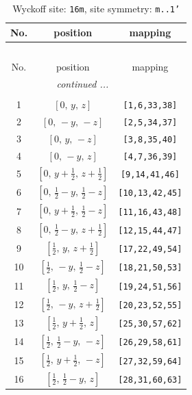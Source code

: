\documentclass[fleqn,8pt]{jsarticle}
\begin{document}
\renewcommand{\arraystretch}{1.2}
\begin{longtable}{ccc}
\caption{Wyckoff site: {\tt 16m}, site symmetry: {\tt m..1'}}
 \\
 \hline \hline
No. & position & mapping \\ \hline \endfirsthead

\multicolumn{2}{l}{\tablename\ \thetable{}} \\
 \hline \hline
No. & position & mapping \\ \hline \endhead

 \hline \hline
\multicolumn{2}{r}{\footnotesize\it continued ...} \\ \endfoot

 \hline \hline
\multicolumn{2}{r}{} \\ \endlastfoot

1 & $\left[ 0,\, y,\, z \right]$ & {\tt [1,6,33,38]} \\ \hline
2 & $\left[ 0,\, - y,\, - z \right]$ & {\tt [2,5,34,37]} \\ \hline
3 & $\left[ 0,\, y,\, - z \right]$ & {\tt [3,8,35,40]} \\ \hline
4 & $\left[ 0,\, - y,\, z \right]$ & {\tt [4,7,36,39]} \\ \hline
5 & $\left[ 0,\, y + \frac{1}{2},\, z + \frac{1}{2} \right]$ & {\tt [9,14,41,46]} \\ \hline
6 & $\left[ 0,\, \frac{1}{2} - y,\, \frac{1}{2} - z \right]$ & {\tt [10,13,42,45]} \\ \hline
7 & $\left[ 0,\, y + \frac{1}{2},\, \frac{1}{2} - z \right]$ & {\tt [11,16,43,48]} \\ \hline
8 & $\left[ 0,\, \frac{1}{2} - y,\, z + \frac{1}{2} \right]$ & {\tt [12,15,44,47]} \\ \hline
9 & $\left[ \frac{1}{2},\, y,\, z + \frac{1}{2} \right]$ & {\tt [17,22,49,54]} \\ \hline
10 & $\left[ \frac{1}{2},\, - y,\, \frac{1}{2} - z \right]$ & {\tt [18,21,50,53]} \\ \hline
11 & $\left[ \frac{1}{2},\, y,\, \frac{1}{2} - z \right]$ & {\tt [19,24,51,56]} \\ \hline
12 & $\left[ \frac{1}{2},\, - y,\, z + \frac{1}{2} \right]$ & {\tt [20,23,52,55]} \\ \hline
13 & $\left[ \frac{1}{2},\, y + \frac{1}{2},\, z \right]$ & {\tt [25,30,57,62]} \\ \hline
14 & $\left[ \frac{1}{2},\, \frac{1}{2} - y,\, - z \right]$ & {\tt [26,29,58,61]} \\ \hline
15 & $\left[ \frac{1}{2},\, y + \frac{1}{2},\, - z \right]$ & {\tt [27,32,59,64]} \\ \hline
16 & $\left[ \frac{1}{2},\, \frac{1}{2} - y,\, z \right]$ & {\tt [28,31,60,63]} \\
\end{longtable}
\end{document}
